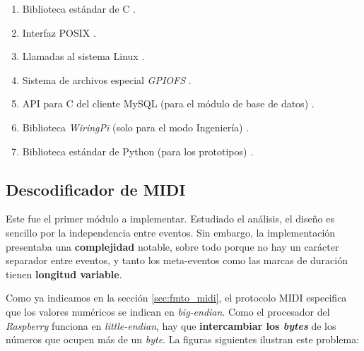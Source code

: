 \begin{enumerate}
	\item Biblioteca estándar de C \cite{cplusplus}.
	\item Interfaz \acrshort{POSIX} \cite{wiki_posix}.
	\item Llamadas al sistema Linux \cite{manpages}.
	\item Sistema de archivos especial \textit{GPIOFS} \cite{gpiofs}.
	\item \acrshort{API} para C del cliente MySQL (para el módulo de base de datos) \cite{mysql}.
	\item Biblioteca \textit{WiringPi} (solo para el modo Ingeniería) \cite{wiringpi}.
	\item Biblioteca estándar de Python (para los prototipos) \cite{python}.
\end{enumerate}

\subsection{Descodificador de MIDI}

Este fue el primer módulo a implementar. Estudiado el análisis, el diseño es sencillo por la independencia entre eventos. Sin embargo, la implementación presentaba una \textbf{complejidad} notable, sobre todo porque no hay un carácter separador entre eventos, y tanto los meta-eventos como las marcas de duración tienen \textbf{longitud variable}.

Como ya indicamos en la sección \ref{sec:fmto_midi}, el protocolo \acrshort{MIDI} especifica que los valores numéricos se indican en \textit{big-endian}. Como el procesador del \textit{Raspberry} funciona en \textit{little-endian}, hay que \textbf{intercambiar los \textit{bytes}} de los números que ocupen más de un \textit{byte}. La figuras siguientes ilustran este problema:

\smallskip

